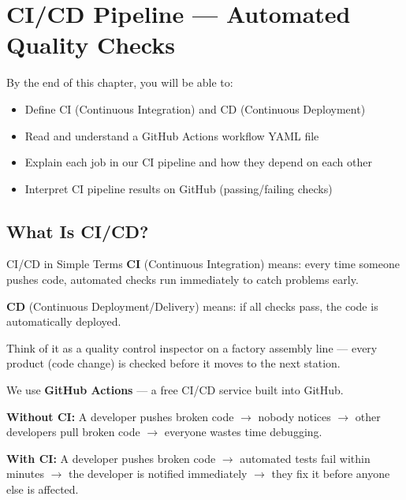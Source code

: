 \documentclass[12pt, a4paper, oneside]{report}
\begin{document}
\chapter{CI/CD Pipeline --- Automated Quality Checks}
\label{ch:cicd}

\begin{objectivebox}
By the end of this chapter, you will be able to:
\begin{itemize}
    \item Define CI (Continuous Integration) and CD (Continuous Deployment)
    \item Read and understand a GitHub Actions workflow YAML file
    \item Explain each job in our CI pipeline and how they depend on each other
    \item Interpret CI pipeline results on GitHub (passing/failing checks)
\end{itemize}
\end{objectivebox}

\section{What Is CI/CD?}

\begin{conceptbox}{CI/CD in Simple Terms}
\textbf{CI} (Continuous Integration) means: every time someone pushes code, automated checks run immediately to catch problems early.

\textbf{CD} (Continuous Deployment/Delivery) means: if all checks pass, the code is automatically deployed.

Think of it as a quality control inspector on a factory assembly line --- every product (code change) is checked before it moves to the next station.

We use \textbf{GitHub Actions} --- a free CI/CD service built into GitHub.

\textbf{Without CI:} A developer pushes broken code $\rightarrow$ nobody notices $\rightarrow$ other developers pull broken code $\rightarrow$ everyone wastes time debugging.

\textbf{With CI:} A developer pushes broken code $\rightarrow$ automated tests fail within minutes $\rightarrow$ the developer is notified immediately $\rightarrow$ they fix it before anyone else is affected.
\end{conceptbox}
\end{document}
